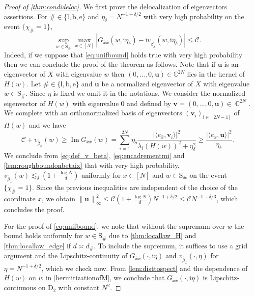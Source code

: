 \documentclass[10pt,a4paper]{amsart}
\DeclareMathOperator{\Ima}{Im}
\DeclareMathOperator{\CC}{\mathbb{C}}
\newcommand{\ii}{\mathrm{i}}
\newcommand{\abs}[1]{\left| #1 \right|}
\newcommand{\norm}[1]{\left\| #1 \right\|}
\newcommand{\C}{\mathbb{C}}
\numberwithin{equation}{section}
\newcommand*\ubarr[1]{{\widehat{#1}}}
\begin{document}
		\begin{proof}[Proof of \cref{thm:condideloc}]
   
		We first prove the delocalization of eigenvectors assertions. For $\# \in \{\mathrm{l},\mathrm{b},\mathrm{e}\}$ and $\eta_{\delta}= N^{-1+ \delta/2}$ with very high probability on the event $\{\chi_{\#}=1\}$, 
		\begin{equation}\label{eq:unifbound}
			\sup_{w \in \mathrm{S}_{\#}} \max_{x \in [N]}\abs{G_{\ubarr{x}\ubarr{x}}(w, \ii \eta_\delta) - \ii v_{\ubarr{\beta}_{x}}(w, \ii \eta_{\delta})} \le \mathcal{C}.
		\end{equation}
	 Indeed, if we suppose that \cref{eq:unifbound} holds true with very high probability then we can conclude the proof of the theorem as follows. Note that if $\mathbf u$ is an eigenvector of $X$ with eigenvalue $w$ then $(0,\ldots, 0,\mathbf u) \in \C^{2N}$ lies in the kernel of $H(w)$. 
		Let $\# \in \{\mathrm{l},\mathrm{b},\mathrm{e}\}$ and $\mathbf{u}$ be a normalized eigenvector of $X$ with eigenvalue $w \in \mathrm{S}_{\#}$. Since $\eta $ is fixed we omit it in the notations. We consider the normalized eigenvector of $H(w)$ with eigenvalue $0$ and defined by $\mathbf{v} = (0,...,0, \mathbf{u}) \in \CC^{2N}$. We complete with an orthonormalized basis of eigenvectors $(\mathbf{v}_{i})_{i \in [2N-1]}$ of $H(w)$ and we have
		\begin{equation*}
			\mathcal{C} + v_{\ubarr{\beta}_x}(w)\ge \Ima G_{\ubarr{x}\ubarr{x}} (w)  = \sum_{i=1}^{2N} \eta_{\delta} \frac{\abs{\langle e_{\ubarr{x}},\mathbf{v}_i\rangle}^2}{\lambda_{i} (H(w))^2 + \eta_{\delta}^2} \ge \frac{\abs{\langle e_{x},\mathbf{u} \rangle}^2}{\eta_{\delta}}. 
		\end{equation*}
		 We conclude from \cref{eq:def_v_beta}, \cref{eq:encadrementmi} and \cref{lem:roughboundonbetaix}  that with very high probability,   $v_{\ubarr{\beta}_{x}}(w)  \lesssim_{\delta} \left( 1 + \frac{\log N}{d} \right)$ uniformly for $x\in [N]$ and $w \in \mathrm{S}_{\#}$ on the event $\{\chi_{\#}=1\}$. Since the previous inequalities are independent of the choice of the coordinate $x$, we obtain $\norm{\mathbf u}^2_\infty \le \mathcal C \left( 1 + \frac{\log N}{d} \right) N^{-1+ \delta/2} \le \mathcal C N^{-1+ \delta/3}$, which concludes the proof.  
		 
For the proof of \cref{eq:unifbound}, we note that without the supremum over $w$ the bound holds uniformly for $w \in \mathrm{S}_\#$ due to \cref{thm:locallaw_H} and \cref{thm:locallaw_edge} if $d \asymp d_\#$. To include the supremum, it suffices to use a grid argument and the Lipschitz-continuity of $G_{\ubarr{x}\ubarr{x}}(\cdot, \ii \eta)$ and $v_{\ubarr{\beta}_x}( \cdot, \eta)$ for $\eta = N^{-1 + \delta/2}$, which we check now. 
		From \cref{lem:disttospect} and the dependence of $H(w)$ on $w$ in \cref{hermitizationofM}, we conclude that 
		$G_{\ubarr{x}\ubarr{x}}(\cdot, \ii \eta)$ is Lipschitz-continuous on $\mathrm{D}_2$ with constant $N^2$. 
		

\end{proof}
\end{document}
